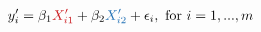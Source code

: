 \documentclass[10pt]{article}
\begin{document}
\begin{align*}y_i^\prime = \beta_1 {\color[rgb]{0.792157,0.090196,0.109804}X_{i1}^\prime} + \beta_2 {\color[rgb]{0.129412,0.439216,0.709804}X_{i2}^\prime} + \epsilon_i , \ \mathrm{for}\ i  =  1,...,m\end{align*}
\end{document}
